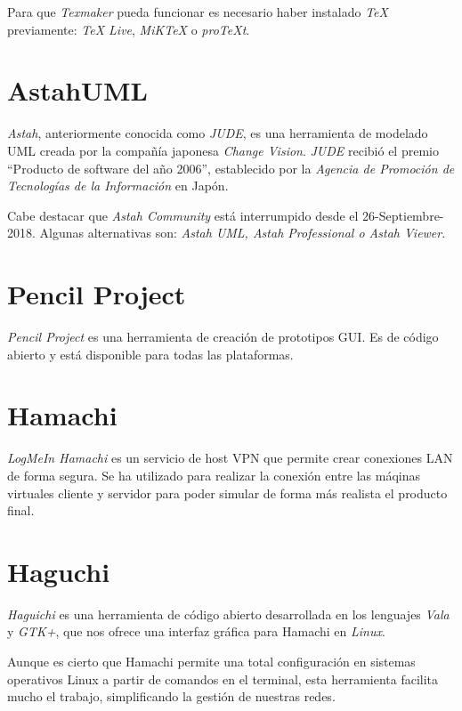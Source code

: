 Para que \textit{Texmaker} pueda funcionar es necesario haber instalado \textit{TeX} previamente: \textit{TeX Live}, \textit{MiKTeX} o \textit{proTeXt}.

\section{AstahUML}
\textit{Astah}\cite{wiki:astah}, anteriormente conocida como \textit{JUDE}, es una herramienta de modelado UML creada por la compañía japonesa \textit{Change Vision}. \textit{JUDE} recibió el premio ``Producto de software del año 2006'', establecido por la \textit{Agencia de Promoción de Tecnologías de la Información} en Japón.

Cabe destacar que \textit{Astah Community} está interrumpido desde el 26-Septiembre-2018. Algunas alternativas son: \textit{Astah UML, Astah Professional o Astah Viewer}.
\section{Pencil Project}
\textit{Pencil Project}\cite{wiki:pencil} es una herramienta de creación de prototipos GUI. Es de código abierto y está disponible para todas las plataformas.
\section{Hamachi}
\textit{LogMeIn Hamachi}\cite{wiki:hamachi} es un servicio de host VPN que permite crear conexiones LAN de forma segura.
Se ha utilizado para realizar la conexión entre las máqinas virtuales cliente y servidor para poder simular de forma más realista el producto final.
\section{Haguchi}
\textit{Haguichi}\cite{wiki:haguichi} es una herramienta de código abierto desarrollada en los lenguajes \textit{Vala} y \textit{GTK+}, que nos ofrece una interfaz gráfica para Hamachi en \textit{Linux}.

Aunque es cierto que Hamachi permite una total configuración en sistemas operativos Linux a partir de comandos en el terminal, esta herramienta facilita mucho el trabajo, simplificando la gestión de nuestras redes.
